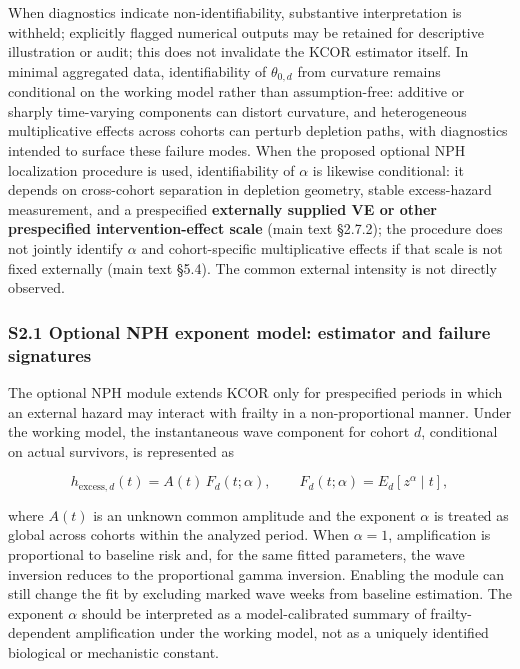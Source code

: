 \documentclass[
]{article}
\begin{document}
When diagnostics indicate non-identifiability, substantive interpretation is withheld; explicitly flagged numerical outputs may be retained for descriptive illustration or audit; this does not invalidate the KCOR estimator itself. In minimal aggregated data, identifiability of \(\theta_{0,d}\) from curvature remains conditional on the working model rather than assumption-free: additive or sharply time-varying components can distort curvature, and heterogeneous multiplicative effects across cohorts can perturb depletion paths, with diagnostics intended to surface these failure modes. When the proposed optional NPH localization procedure is used, identifiability of \(\alpha\) is likewise conditional: it depends on cross-cohort separation in depletion geometry, stable excess-hazard measurement, and a prespecified \textbf{externally supplied VE or other prespecified intervention-effect scale} (main text §2.7.2); the procedure does not jointly identify \(\alpha\) and cohort-specific multiplicative effects if that scale is not fixed externally (main text §5.4). The common external intensity is not directly observed.

\subsubsection{S2.1 Optional NPH exponent model: estimator and failure signatures}\label{s2.1-optional-nph-exponent-model-estimator-and-failure-signatures}

The optional NPH module extends KCOR only for prespecified periods in which an external hazard may interact with frailty in a non-proportional manner. Under the working model, the instantaneous wave component for cohort \(d\), conditional on actual survivors, is represented as

\[h_{\mathrm{excess},d}(t)=A(t)\,F_d(t;\alpha),
\qquad
F_d(t;\alpha)=E_d[z^{\alpha}\mid t],\]

where \(A(t)\) is an unknown common amplitude and the exponent \(\alpha\) is treated as global across cohorts within the analyzed period. When \(\alpha=1\), amplification is proportional to baseline risk and, for the same fitted parameters, the wave inversion reduces to the proportional gamma inversion. Enabling the module can still change the fit by excluding marked wave weeks from baseline estimation. The exponent \(\alpha\) should be interpreted as a model-calibrated summary of frailty-dependent amplification under the working model, not as a uniquely identified biological or mechanistic constant.
\end{document}
